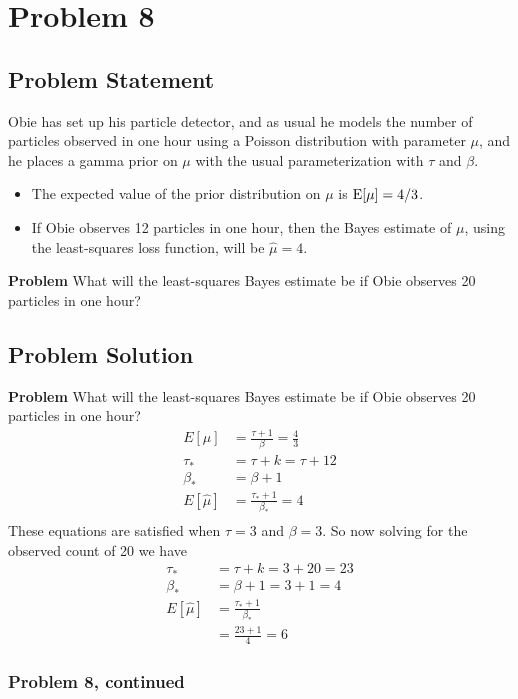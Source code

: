 \documentclass[12pt]{article}
\theoremstyle{definition}
\begin{document}
\newpage
\section*{Problem 8}

\subsection*{Problem Statement}

Obie has set up his particle detector, and as usual he models the number of particles observed in one hour using a Poisson distribution with parameter $\mu$, and he places a gamma prior on $\mu$ with the usual parameterization with $\tau$ and $\beta$.
\begin{itemize}
	\item The expected value of the prior distribution on $\mu$ is $\hbox{E}[\mu] = 4/3$.
	\item If Obie observes 12 particles in one hour, then the Bayes estimate of $\mu$, using the least-squares loss function, will be $\hat{\mu} = 4$.
\end{itemize}

\bigskip
\noindent
{\bf Problem} What will the least-squares Bayes estimate be if Obie observes 20 particles in one hour?



\subsection*{Problem Solution}

\noindent
{\bf Problem} What will the least-squares Bayes estimate be if Obie observes 20 particles in one hour?
\begin{align*}
E[\mu] &= \frac{\tau + 1}{\beta} = \frac{4}{3}\\
\tau_* &= \tau + k = \tau + 12\\
\beta_* &= \beta + 1 \\
E[\hat{\mu}] &= \frac{\tau_* + 1}{\beta_*} = 4\\
\end{align*}
These equations are satisfied when $\tau = 3$ and $\beta = 3$. So now solving for the observed count of 20 we have
\begin{align*}
\tau_* &= \tau + k = 3 + 20 = 23\\
\beta_* &= \beta + 1 = 3 + 1 = 4\\
E[\hat{\mu}] &= \frac{\tau_* + 1}{\beta_*}\\
&= \frac{23 + 1}{4} = 6
\end{align*}

\newpage
\subsubsection*{Problem 8, continued}
\end{document}
